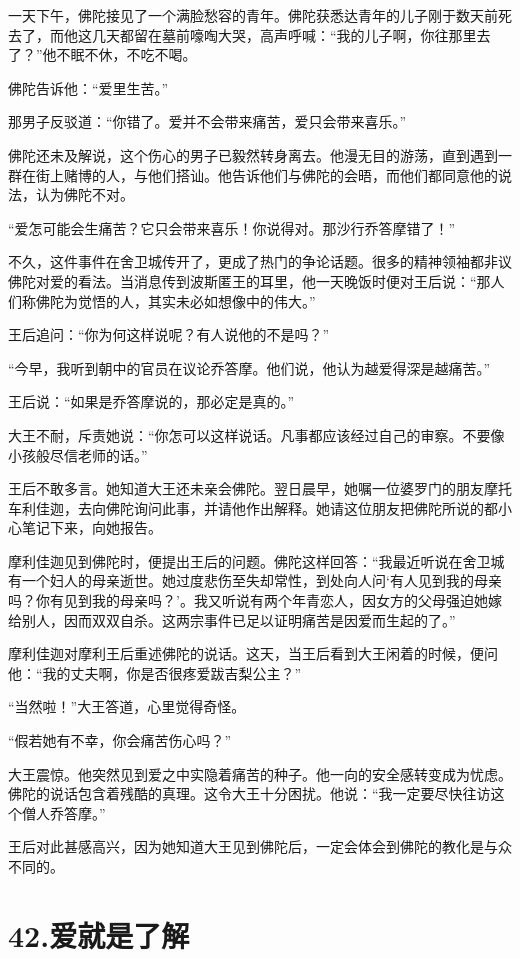 \documentclass[12pt,twoside,openany]{book}
\begin{document}
一天下午，佛陀接见了一个满脸愁容的青年。佛陀获悉达青年的儿子刚于数天前死去了，而他这几天都留在墓前嚎啕大哭，高声呼喊：“我的儿子啊，你往那里去了？”他不眠不休，不吃不喝。

佛陀告诉他：“爱里生苦。”

那男子反驳道：“你错了。爱并不会带来痛苦，爱只会带来喜乐。”

佛陀还未及解说，这个伤心的男子已毅然转身离去。他漫无目的游荡，直到遇到一群在街上赌博的人，与他们搭讪。他告诉他们与佛陀的会晤，而他们都同意他的说法，认为佛陀不对。

“爱怎可能会生痛苦？它只会带来喜乐！你说得对。那沙行乔答摩错了！”

不久，这件事件在舍卫城传开了，更成了热门的争论话题。很多的精神领袖都非议佛陀对爱的看法。当消息传到波斯匿王的耳里，他一天晚饭时便对王后说：“那人们称佛陀为觉悟的人，其实未必如想像中的伟大。”

王后追问：“你为何这样说呢？有人说他的不是吗？”

“今早，我听到朝中的官员在议论乔答摩。他们说，他认为越爱得深是越痛苦。”

王后说：“如果是乔答摩说的，那必定是真的。”

大王不耐，斥责她说：“你怎可以这样说话。凡事都应该经过自己的审察。不要像小孩般尽信老师的话。”

王后不敢多言。她知道大王还未亲会佛陀。翌日晨早，她嘱一位婆罗门的朋友摩托车利佳迦，去向佛陀询问此事，并请他作出解释。她请这位朋友把佛陀所说的都小心笔记下来，向她报告。

摩利佳迦见到佛陀时，便提出王后的问题。佛陀这样回答：“我最近听说在舍卫城有一个妇人的母亲逝世。她过度悲伤至失却常性，到处向人问‘有人见到我的母亲吗？你有见到我的母亲吗？’。我又听说有两个年青恋人，因女方的父母强迫她嫁给别人，因而双双自杀。这两宗事件已足以证明痛苦是因爱而生起的了。”

摩利佳迦对摩利王后重述佛陀的说话。这天，当王后看到大王闲着的时候，便问他：“我的丈夫啊，你是否很疼爱跋吉梨公主？”

“当然啦！”大王答道，心里觉得奇怪。

“假若她有不幸，你会痛苦伤心吗？”

大王震惊。他突然见到爱之中实隐着痛苦的种子。他一向的安全感转变成为忧虑。佛陀的说话包含着残酷的真理。这令大王十分困扰。他说：“我一定要尽快往访这个僧人乔答摩。”

王后对此甚感高兴，因为她知道大王见到佛陀后，一定会体会到佛陀的教化是与众不同的。


\chapter{42.爱就是了解}\label{ch42}
\end{document}
